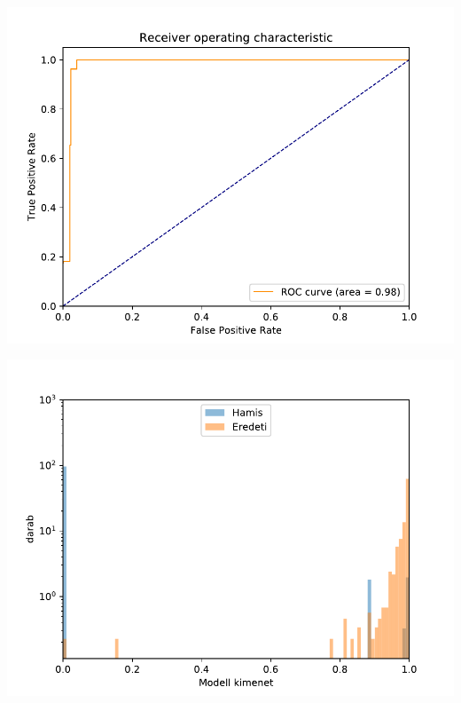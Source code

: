 \documentclass[11pt]{beamer}
\begin{document}
\begin{frame}
\begin{columns} [t]
\begin{column}{.5\textwidth}
		\includegraphics[scale=0.25]{roc-curve-full-dataset-ujratanitva.pdf}
		
		\includegraphics[scale=0.25]{histogram-ujratanitott-log-skala-full.pdf}
		
	\end{column}				
\end{columns}



%	
%		
%		
%			
%			


\end{frame}
\end{document}
